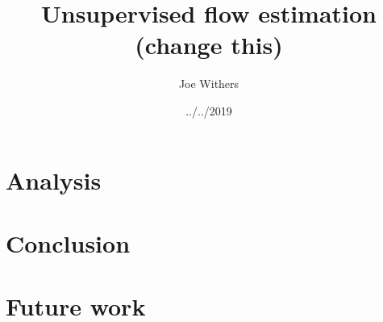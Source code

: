 \documentclass{article}
\begin{document}
 
\title{Unsupervised flow estimation (change this)}
\author{Joe Withers}
\date{../../2019}
\maketitle















\section{Analysis}

\section{Conclusion}

\section{Future work}
\end{document}
